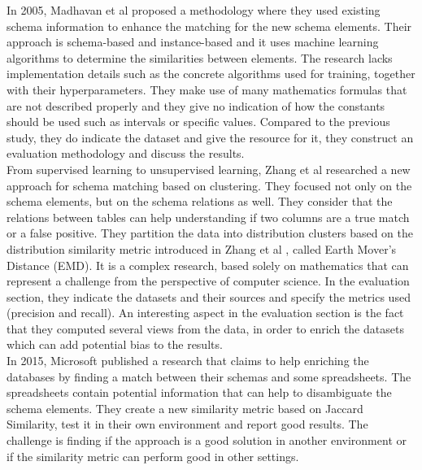 \documentclass[a4paper]{article}
\begin{document}
In 2005, Madhavan et al \cite{madhavan2005corpus} proposed a methodology where they used existing schema information to enhance the matching for the new schema elements. Their approach is schema-based and instance-based and it uses machine learning algorithms to determine the similarities between elements. The research lacks implementation details such as the concrete algorithms used for training, together with their hyperparameters. They make use of many mathematics formulas that are not described properly and they give no indication of how the constants should be used such as intervals or specific values. Compared to the previous study, they do indicate the dataset and give the resource for it, they construct an evaluation methodology and discuss the results. \\

From supervised learning to unsupervised learning, Zhang et al \cite{zhang2011automatic} researched a new approach for schema matching based on clustering. They focused not only on the schema elements, but on the schema relations as well. They consider that the relations between tables can help understanding if two columns are a true match or a false positive. They partition the data into distribution clusters based on the distribution similarity metric introduced in Zhang et al \cite{zhang2010multi}, called Earth Mover's Distance (EMD). It is a complex research, based solely on mathematics that can represent a challenge from the perspective of computer science. In the evaluation section, they indicate the datasets and their sources and specify the metrics used (precision and recall). An interesting aspect in the evaluation section is the fact that they computed several views from the data, in order to enrich the datasets which can add potential bias to the results. \\

In 2015, Microsoft \cite{cortez2015annotating} published a research that claims to help enriching the databases by finding a match between their schemas and some spreadsheets. The spreadsheets contain potential information that can help to disambiguate the schema elements. They create a new similarity metric based on Jaccard Similarity, test it in their own environment and report good results. The challenge is finding if the approach is a good solution in another environment or if the similarity metric can perform good in other settings. \\
\end{document}
